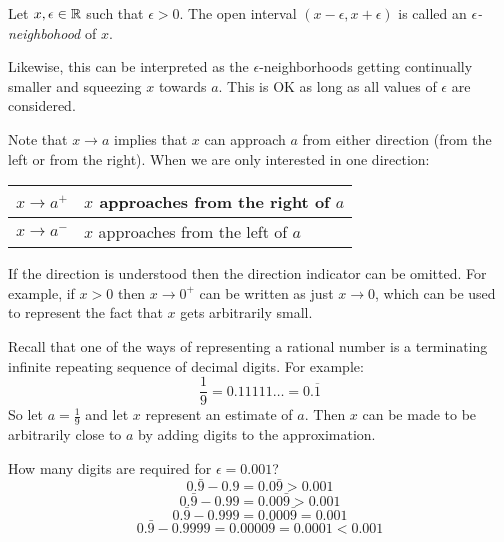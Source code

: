 \documentclass[letterpaper,12pt,fleqn]{article}
\newcommand{\e}{\epsilon}
\begin{document}
\begin{definition}[Neighborhood]
  Let \(x,\e\in\R\) such that \(\e>0\).  The open interval \((x-\e,x+\e)\) is called an \emph{\(\e\)-neighbohood}
  of \(x\).
\end{definition}

Likewise, this can be interpreted as the \(\e\)-neighborhoods getting continually smaller and squeezing \(x\)
towards \(a\).  This is OK as long as all values of \(\e\) are considered.

\begin{notation}
Note that \(x\to a\) implies that \(x\) can approach \(a\) from either direction (from the left or from the right).
When we are only interested in one direction:

\bigskip

\begin{center}
  \begin{tabular}{|c|l|}
    \hline
    \(x\to a^+\) & \(x\) approaches from the right of \(a\) \\
    \hline
    \(x\to a^-\) & \(x\) approaches from the left of \(a\) \\
    \hline
  \end{tabular}
\end{center}

\bigskip

If the direction is understood then the direction indicator can be omitted.  For example, if \(x>0\) then
\(x\to0^+\) can be written as just \(x\to0\), which can be used to represent the fact that \(x\) gets arbitrarily
small.
\end{notation}

\newpage

\begin{example}
  Recall that one of the ways of representing a rational number is a terminating infinite repeating sequence of
  decimal digits.  For example:
  \[\frac{1}{9}=0.11111\ldots=0.\overline{1}\]
  So let \(a=\frac{1}{9}\) and let \(x\) represent an estimate of \(a\).  Then \(x\) can be made to be arbitrarily
  close to \(a\) by adding digits to the approximation.

  \bigskip

  \begin{center}
  \end{center}

  How many digits are required for \(\e=0.001\)?
  \[0.\bar{9}-0.9=0.0\bar{9}>0.001\]
  \[0.\bar{9}-0.99=0.00\bar{9}>0.001\]
  \[0.\bar{9}-0.999=0.000\bar{9}=0.001\]
  \[0.\bar{9}-0.9999=0.0000\bar{9}=0.0001<0.001\]
\end{example}
\end{document}
